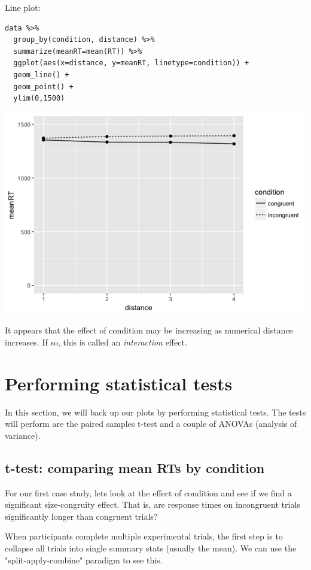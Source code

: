 \documentclass[11pt]{article}
\begin{document}
Line plot:

\begin{verbatim}
data %>%
  group_by(condition, distance) %>%
  summarize(meanRT=mean(RT)) %>%
  ggplot(aes(x=distance, y=meanRT, linetype=condition)) +
  geom_line() +
  geom_point() +
  ylim(0,1500)
\end{verbatim}

\includegraphics[width=.9\linewidth]{figures/week5/lineplot3.png}

It appears that the effect of condition may be increasing as numerical distance increases.  If so, this is called an \emph{interaction} effect.

\section*{Performing statistical tests}
\label{sec-5}

In this section, we will back up our plots by performing statistical tests.  The tests will perform are the paired samples t-test and a couple of ANOVAs (analysis of variance).

\subsection*{t-test: comparing mean RTs by condition}
\label{sec-5-1}

For our first case study, lets look at the effect of condition and see if we find a significant size-congruity effect.  That is, are response times on incongruent trials significantly longer than congruent trials?

When participants complete multiple experimental trials, the first step is to collapse all trials into single summary stats (usually the mean).  We can use the "split-apply-combine" paradigm to see this.
\end{document}
